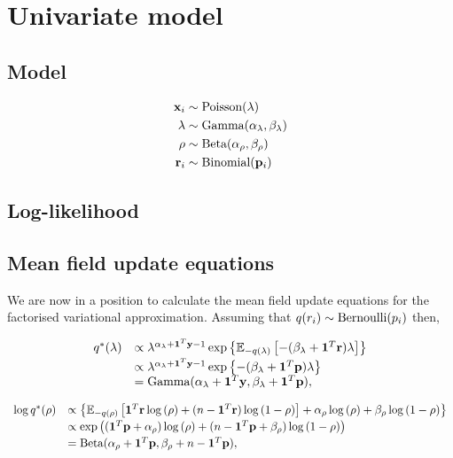 \documentclass[11pt]{amsart}
\begin{document}
\section{Univariate model} 

\subsection{Model}
\begin{align*}
	{\bf x}_i   & \sim \text{Poisson}(\lambda)                    \\
	\lambda & \sim \text{Gamma}(\alpha_\lambda,\beta_\lambda) \\
	\rho    & \sim \text{Beta}(\alpha_\rho, \beta_\rho)       \\
	{\bf r}_i   & \sim \text{Binomial}({\bf p}_i)                     
\end{align*}

\subsection{Log-likelihood}


\subsection{Mean field update equations}
We are now in a position to calculate the mean field update equations for the factorised
variational approximation.
Assuming that $q(r_i) \sim \text{Bernoulli} (p_i)$ then,

$$
\begin{array}{rl}
	q^*(\lambda)
	  & \propto                                                            
	\lambda^{\alpha_\lambda+{\bf 1}^T{\bf y} - 1} 
	\exp\left\{ 
	{\mathbb E}_{-q(\lambda)} \left[
	-(\beta_\lambda + {\bf 1}^T{\bf r}) \lambda 
	\right] 
	\right\} 
	\\ [0.5ex]
	  &                                                                    
	\propto \lambda^{\alpha_\lambda+{\bf 1}^T{\bf y} - 1} \exp{\left \{-(\beta_\lambda + {\bf1}^T{\bf p})\lambda \right \} } 
	\\
	  & = \text{Gamma} (\alpha_\lambda+{\bf 1}^T{\bf y}, \beta_\lambda+{\bf 1}^T{\bf p}), 
\end{array}
$$

$$
\begin{array}{rl}
	\log{q^*(\rho)} 
	  &                                                                 
	\propto \left\{ 
	{\mathbb E}_{-q(\rho)}\left[ 
	{\bf 1}^T{\bf r} \log{(\rho)} 
	+ (n - {\bf 1}^T{\bf r}) \log{(1 - \rho)} 
	\right] 
	+ \alpha_\rho \log{(\rho)} 
	+ \beta_\rho \log{(1 - \rho)} 
	\right\} 
	\\ [0.5ex]
	  &                                                                 
	\propto \exp \left( 
	({\bf 1}^T{\bf p} + \alpha_\rho) \log{(\rho)} 
	+ (n - {\bf 1}^T{\bf p} + \beta_\rho) \log{(1 - \rho)} 
	\right) 
	\\ [0.5ex]
	  & = \text{Beta}(\alpha_\rho + {\bf 1}^T{\bf p}, \beta_\rho + n - {\bf 1}^T{\bf p}), 
\end{array}
$$
\end{document}
